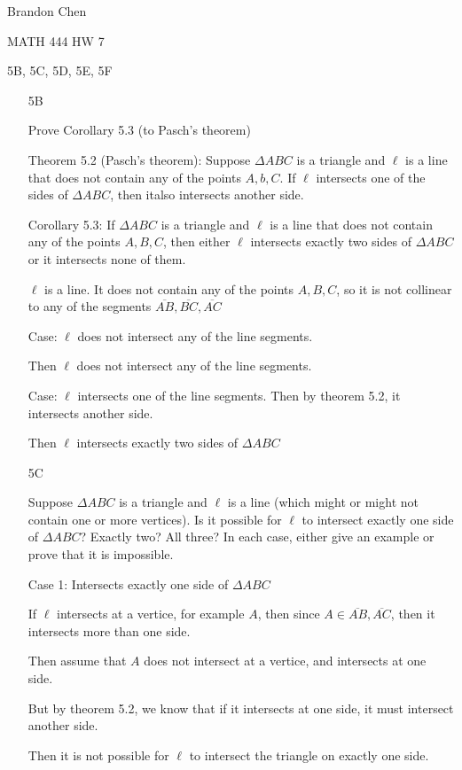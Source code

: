 \documentclass[11pt]{article}
\newcommand{\segment}[1]{\overline{#1}}
\begin{document}
\noindent Brandon Chen

\noindent MATH 444 HW 7

\noindent 5B, 5C, 5D, 5E, 5F

\begin{itemize} 
	\item[5B]

		Prove Corollary 5.3 (to Pasch's theorem)

		Theorem 5.2 (Pasch's theorem): Suppose $\Delta ABC$ is a triangle and $\ell$ is a line that does not contain any of the points $A,b,C$. If $\ell$ intersects one of the sides of $\Delta ABC$, then italso intersects another side.

		Corollary 5.3: If $\Delta ABC$ is a triangle and $\ell$ is a line that does not contain any of the points $A,B,C$, then either $\ell$ intersects exactly two sides of $\Delta ABC$ or it intersects none of them.

		$\ell$ is a line. It does not contain any of the points $A,B,C$, so it is not collinear to any of the segments $\segment{AB}, \segment{BC}, \segment{AC}$

		Case: $\ell$ does not intersect any of the line segments. 

		Then $\ell$ does not intersect any of the line segments.

		Case: $\ell$ intersects one of the line segments. Then by theorem 5.2, it intersects another side.

		Then $\ell$ intersects exactly two sides of $\Delta ABC$

	\item[5C]

		Suppose $\Delta ABC$ is a triangle and $\ell$ is a line (which might or might not contain one or more vertices). Is it possible for $\ell$ to intersect exactly one side of $\Delta ABC$? Exactly two? All three? In each case, either give an example or prove that it is impossible.

		Case 1: Intersects exactly one side of $\Delta ABC$

		If $\ell$ intersects at a vertice, for example $A$,  then since $A \in \segment{AB}, \segment{AC}$, then it intersects more than one side.

		Then assume that $A$ does not intersect at a vertice, and intersects at one side.

		But by theorem 5.2, we know that if it intersects at one side, it must intersect another side.

		Then it is not possible for $\ell$ to intersect the triangle on exactly one side.


\end{itemize}
\end{document}
